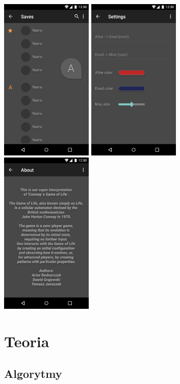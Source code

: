 \documentclass[12pt,a4paper]{article}
\begin{document}
\includegraphics[width=0.33\textwidth]{Images/ui_saves.png}
\includegraphics[width=0.33\textwidth]{Images/ui_settings.png}
\includegraphics[width=0.33\textwidth]{Images/ui_about.png}
\section{Teoria}
\subsection{Algorytmy}
\end{document}
